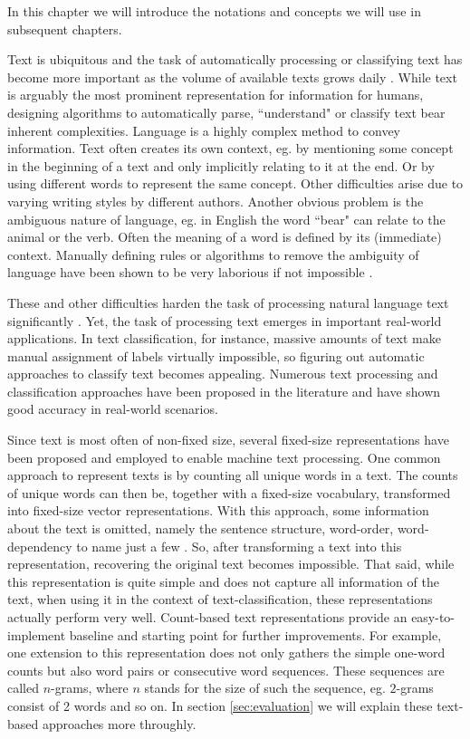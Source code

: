 In this chapter we will introduce the notations and concepts we will use in subsequent chapters.


Text is ubiquitous and the task of automatically processing or classifying text has become more important as the volume of available texts grows daily \cite{Joachims1998}.
While text is arguably the most prominent representation for information for humans, designing algorithms to automatically parse, ``understand" or classify text bear inherent complexities.
Language is a highly complex method to convey information. 
Text often creates its own context, eg. by mentioning some concept in the beginning of a text and only implicitly relating to it at the end. Or by using different words to represent the same concept.
Other difficulties arise due to varying writing styles by different authors.
Another obvious problem is the ambiguous nature of language\cite{Britton1978}, eg. in English the word ``bear" can relate to the animal or the verb.
Often the meaning of a word is defined by its (immediate) context.
Manually defining rules or algorithms to remove the ambiguity of language have been shown to be very laborious if not impossible \cite[p.~11]{Weikum2002}.

These and other difficulties harden the task of processing natural language text significantly \cite{Chowdhury2003,Weikum2002}.
Yet, the task of processing text emerges in important real-world applications.
In text classification, for instance, massive amounts of text make manual assignment of labels virtually impossible, so figuring out automatic approaches to classify text becomes appealing.
Numerous text processing and classification approaches have been proposed in the literature and have shown good accuracy in real-world scenarios.

Since text is most often of non-fixed size, several fixed-size representations have been proposed and employed to enable machine text processing.
One common approach to represent texts is by counting all unique words in a text. The counts of unique words can then be, together with a fixed-size vocabulary, transformed into fixed-size vector representations.
With this approach, some information about the text is omitted, namely the sentence structure, word-order, word-dependency to name just a few \cite{Chowdhury2003}.
So, after transforming a text into this representation, recovering the original text becomes impossible.
That said, while this representation is quite simple and does not capture all information of the text, when using it in the context of text-classification, these representations actually perform very well.
Count-based text representations provide an easy-to-implement baseline and starting point for further improvements.
For example, one extension to this representation does not only gathers the simple one-word counts but also word pairs or consecutive word sequences. These sequences are called $n$-grams, where $n$ stands for the size of such the sequence, eg. $2$-grams consist of 2 words and so on.
In section \ref{sec:evaluation} we will explain these text-based approaches more throughly.

